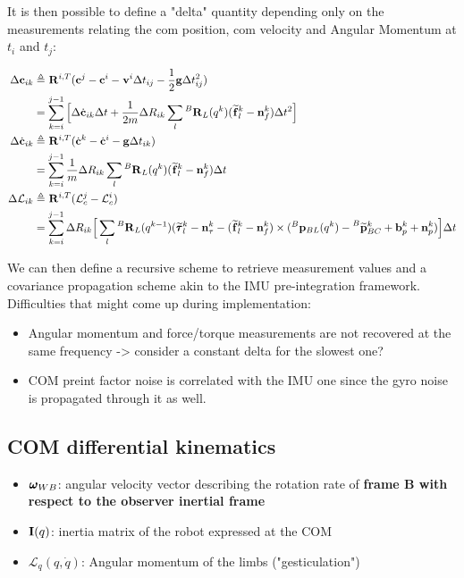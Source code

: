 \documentclass[11pt]{article}
\newcommand{\Rot}[2]{\prescript{#1}{}{\bfR}_{#2}}
\newcommand{\noise}{\bfn}
\newcommand{\posi}[2]{\prescript{#1}{}{\bfp}_{#2}}
\newcommand{\posim}[2]{\prescript{#1}{}{\widetilde{\bfp}}_{#2}}
\newcommand{\vel}[2]{\prescript{#1}{}{\bfv}_{#2}}
\newcommand{\angvel}[2]{\prescript{#1}{}{\pmb{\omega}}_{#2}}
\newcommand{\forcem}[2]{\prescript{#1}{}{\widetilde{\bff}}_{#2}}
\newcommand{\torquem}[2]{\prescript{#1}{}{\widetilde{\pmb{\tau}}}_{#2}}
\newcommand{\AM}{\mathcal{L}}
\newcommand{\COM}{\bfc}
\newcommand{\grav}{\bfg}
\begin{document}
It is then possible to define a "delta" quantity depending only on the measurements relating the com position, com velocity and Angular Momentum at \(t_i\) and \(t_j\):

\begin{equation}
\begin{split}
    \Delta \COM_{ik} &\triangleq \Rot{}{}^{i,T} (\COM^j - \COM^i - \vel{}{}^i \Delta t_{ij} - \frac{1}{2}\grav \Delta t_{ij}^2) 
    \\
    &= \sum_{k=i}^{j-1} \Big[ \Delta \dot{\COM}_{ik} \Delta t + \frac{1}{2m} \Delta R_{ik} \sum_l \Rot{B}{L}(q^{k}) (\forcem{}{l}^{k} - \noise_f^{k}) \Delta t^2 \Big]
\\
    \Delta \dot{\COM}_{ik} &\triangleq \Rot{}{}^{i,T} (\dot{\COM}^{k} - \dot{\COM}^{i} - \bfg \Delta t_{ik})
\\
    &= \sum_{k=i}^{j-1} \frac{1}{m} \Delta R_{ik} \sum_l \Rot{B}{L}(q^{k}) (\forcem{}{l}^{k} - \noise_f^{k}) \Delta t 
\\
    \Delta \AM_{ik} &\triangleq \Rot{}{}^{i,T} (\AM_c^{j} - \AM_c^{i})
\\
     &=  \sum_{k=i}^{j-1} \Delta R_{ik} \Big[ 
    \sum_l \Rot{B}{L}(q^{k-1}) (\torquem{}{l}^{k} - \noise_{\tau}^{k} - (\forcem{}{l}^{k} - \noise_f^{k}) \times (\posi{B}{BL}(q^k) - \posim{B}{BC}^k + \bfb_{p}^k + \noise_p^k) \Big]  \Delta t
\end{split}
\label{eq:COMPreint}
\end{equation}

We can then define a recursive scheme to retrieve measurement values and a covariance propagation scheme akin to the IMU pre-integration framework. 
Difficulties that might come up during implementation:

\begin{itemize}
    \item Angular momentum and force/torque measurements are not recovered at the same frequency -> consider a constant delta for the slowest one?
    \item COM preint factor noise is correlated with the IMU one since the gyro noise is propagated through it as well.
\end{itemize}



\subsection{COM differential kinematics}

\begin{itemize}
    \item \( \angvel{}{WB} \): angular velocity vector describing the rotation rate of \textbf{frame B with respect to the observer inertial frame}
    \item \( {\bf I}(q) \): inertia matrix of the robot expressed at the COM
    \item \( \AM_q (q,\dot{q}) \): Angular momentum of the limbs ("gesticulation")
\end{itemize}
\end{document}
